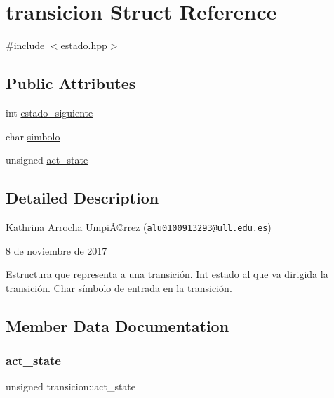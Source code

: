 \hypertarget{structtransicion}{}\section{transicion Struct Reference}
\label{structtransicion}


{\ttfamily \#include $<$estado.\+hpp$>$}

\subsection*{Public Attributes}
\begin{DoxyCompactItemize}
\item 
int \hyperlink{structtransicion_aab8448a756f2c0d24a451a0da057d42e}{estado\+\_\+siguiente}
\item 
char \hyperlink{structtransicion_a27058a2ed163e3340cca81a991a03166}{simbolo}
\item 
unsigned \hyperlink{structtransicion_add6637c953b9e04451fe92b5463b890e}{act\+\_\+state}
\end{DoxyCompactItemize}


\subsection{Detailed Description}
Kathrina Arrocha UmpiÃ©rrez (\href{mailto:alu0100913293@ull.edu.es}{\tt alu0100913293@ull.\+edu.\+es})

8 de noviembre de 2017

Estructura que representa a una transición.  Int estado al que va dirigida la transición.  Char símbolo de entrada en la transición. 

\subsection{Member Data Documentation}
\mbox{\label{structtransicion_add6637c953b9e04451fe92b5463b890e}} 
\subsubsection{\texorpdfstring{act\+\_\+state}{act\_state}}
{\footnotesize\ttfamily unsigned transicion\+::act\+\_\+state}

\mbox{\label{structtransicion_aab8448a756f2c0d24a451a0da057d42e}} 
